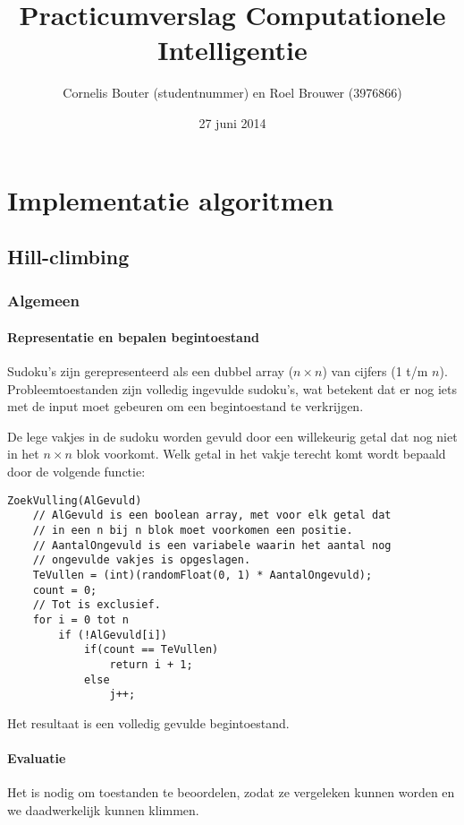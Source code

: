 \documentclass[]{report}
\title{Practicumverslag Computationele Intelligentie}
\author{Cornelis Bouter (studentnummer) en Roel Brouwer (3976866)}
\date{27 juni 2014}
\begin{document}
\maketitle

\chapter{Implementatie algoritmen}
\section{Hill-climbing}
\subsection{Algemeen}
\subsubsection{Representatie en bepalen begintoestand}
Sudoku's zijn gerepresenteerd als een dubbel array ($n \times n$)  van cijfers (1 t/m $n$). Probleemtoestanden zijn volledig ingevulde sudoku's, wat betekent dat er nog iets met de input moet gebeuren om een begintoestand te verkrijgen.

De lege vakjes in de sudoku worden gevuld door een willekeurig getal dat nog niet in het $n \times n$ blok voorkomt. Welk getal in het vakje terecht komt wordt bepaald door de volgende functie:

\begin{minipage}{\textwidth}
\begin{lstlisting}
ZoekVulling(AlGevuld)
	// AlGevuld is een boolean array, met voor elk getal dat
	// in een n bij n blok moet voorkomen een positie.
	// AantalOngevuld is een variabele waarin het aantal nog
	// ongevulde vakjes is opgeslagen.
	TeVullen = (int)(randomFloat(0, 1) * AantalOngevuld);
	count = 0;
	// Tot is exclusief.
	for i = 0 tot n
		if (!AlGevuld[i])
			if(count == TeVullen)
				return i + 1;
			else 
				j++;
\end{lstlisting}
\end{minipage}

Het resultaat is een volledig gevulde begintoestand.

\subsubsection{Evaluatie}
Het is nodig om toestanden te beoordelen, zodat ze vergeleken kunnen worden en we daadwerkelijk kunnen klimmen.
\end{document}
